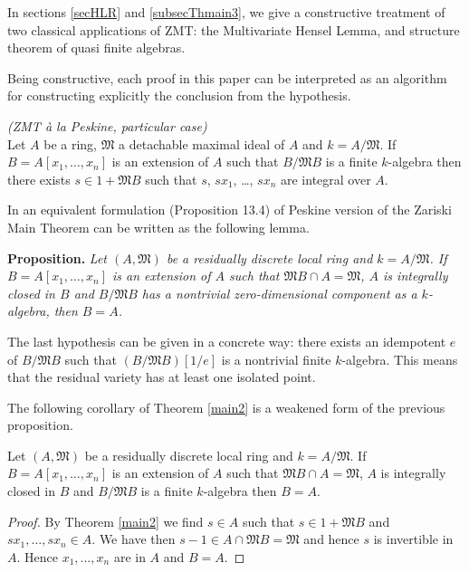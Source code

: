 \documentclass[11pt,a4paper,twoside]{article}
\newcommand{\gothic}{\mathfrak}
\newcommand{\fM}{{\gothic M}}
\begin{document}
In sections \ref{secHLR} and \ref{subsecThmain3}, we give a constructive treatment of two classical applications of ZMT: the Multivariate Hensel Lemma, and structure theorem of quasi finite algebras.

Being constructive, each proof in this paper can be interpreted as
an algorithm for constructing explicitly the conclusion from the hypothesis.  

\begin{theorem}\label{main2} \emph{(ZMT \`a la Peskine, particular case)}\\
Let $A$ be a ring, $\fM$ a detachable maximal ideal of $A$ and $k=A/\fM$. If $B=A[x_1,\dots,x_n]$ 
is an extension of $A$ 
such that $B/\fM B$ is a finite $k$-algebra then there exists $s\in 1+\fM B$ such that
$s$, $sx_1$, \dots, $sx_n$ are integral over $A$.
\end{theorem}

In \cite{PeskineBook}  an equivalent formulation (Proposition 13.4)
of Peskine version of the Zariski Main Theorem can be written as the following
lemma. 

\medskip \noindent 
{\bf Proposition.} {\it Let $(A,\fM)$ be a residually discrete local ring and $k=A/\fM$. 
If $B = A[x_1,\dots,x_n]$ is an extension of $A$ such that
$\fM B\cap A = \fM$, $A$ is integrally closed in $B$ and $B/\fM B$
has a nontrivial zero-dimensional component as a $k$-algebra, 
 then $B=A$.
}
  
\medskip The last hypothesis can be given in a concrete way: there exists
an idempotent $e$ of $B/\fM B$ such that $(B/\fM B)[1/e]$ is a nontrivial
 finite $k$-algebra. This means that the residual variety has at least one isolated point.

\medskip 
The following corollary of Theorem \ref{main2}  is a weakened form of the previous proposition.

\begin{corollary}\label{varmain2}
Let $(A,\fM)$ be a residually discrete local ring and $k=A/\fM$. 
If $B = A[x_1,\dots,x_n]$ is an extension of $A$ such that
$\fM B\cap A = \fM$, $A$ is integrally closed in $B$ and $B/\fM B$ is a finite $k$-algebra then $B=A$.
\end{corollary}


\begin{proof}
By Theorem \ref{main2} we find $s\in A$ such that $s\in1+\fM B$ and
$sx_1,\dots,sx_n\in A$. We have then $s-1\in A\cap \fM B = \fM$
and hence $s$ is invertible in $A$. Hence $x_1,\dots,x_n$ are in $A$ and $B = A$.
\end{proof}
\end{document}
